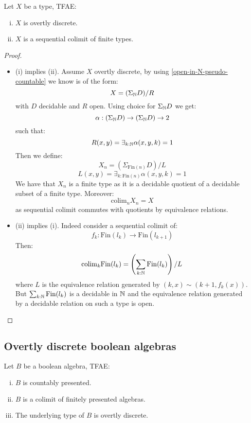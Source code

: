 \begin{lemma}\label{overtly-discrete-colimit-finite}
Let $X$ be a type, TFAE:
\begin{enumerate}[(i)]
\item $X$ is overtly discrete.
\item $X$ is a sequential colimit of finite types.
\end{enumerate}
\end{lemma}

\begin{proof}
\begin{itemize}
\item (i) implies (ii). Assume $X$ overtly discrete, by using \cref{open-in-N-pseudo-countable} we know is of the form:
\[X  = (\Sigma_{\mathbb{N}} D)/R\]
with $D$ decidable and $R$ open. Using choice for $\Sigma_{\mathbb{N}} D$ we get:
\[\alpha : (\Sigma_{\mathbb{N}} D) \to (\Sigma_{\mathbb{N}} D)\to 2\]
such that:
\[R(x,y) = \exists_{k:\mathbb{N}} \alpha(x,y,k) = 1\]
Then we define:
\[X_n = (\Sigma_{\mathrm{Fin}(n)} D) / L\]
\[L(x,y) = \exists_{k:\mathrm{Fin}(n)} \alpha(x,y,k) = 1\]
We have that $X_n$ is a finite type as it is a decidable quotient of a decidable subset of a finite type. Moreover:
\[\mathrm{colim}_n X_n = X\]
as sequential colimit commutes with quotients by equivalence relations.
\item (ii) implies (i). Indeed consider a sequential colimit of:
\[f_k : \mathrm{Fin}(l_k) \to \mathrm{Fin}(l_{k+1})\]
Then:
\[\mathrm{colim}_k \mathrm{Fin}(l_k)  =  \left(\sum_{k:\mathbb{N}} \mathrm{Fin}(l_k)\right) / L\]
where $L$ is the equivalence relation generated by $(k,x) \sim (k+1,f_k(x))$. But $\sum_{k:\mathbb{N}} \mathrm{Fin}(l_k)$ is a decidable in $\mathbb{N}$ and the equivalence relation generated by a decidable relation on such a type is open.
\end{itemize}
\end{proof}


\subsection{Overtly discrete boolean algebras}

\begin{lemma}\label{overtly-discrete-algebra}
Let $B$ be a boolean algebra, TFAE:
\begin{enumerate}[(i)]
\item $B$ is countably presented.
\item $B$ is a colimit of finitely presented algebras.
\item The underlying type of $B$ is overtly discrete.
\end{enumerate}
\end{lemma}

